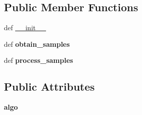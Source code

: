 \subsection*{Public Member Functions}
\begin{DoxyCompactItemize}
\item 
def \hyperlink{classaml__opt_1_1policy__opt_1_1sampler_1_1_batch_sampler_ab3b1c006c6608373f219f70f0bb11c6c}{\-\_\-\-\_\-init\-\_\-\-\_\-}
\item 
\hypertarget{classaml__opt_1_1policy__opt_1_1sampler_1_1_batch_sampler_a04d1b5c2bcd3a4fbdf49872ea14b1f7d}{def {\bfseries obtain\-\_\-samples}}\label{classaml__opt_1_1policy__opt_1_1sampler_1_1_batch_sampler_a04d1b5c2bcd3a4fbdf49872ea14b1f7d}

\item 
\hypertarget{classaml__opt_1_1policy__opt_1_1sampler_1_1_batch_sampler_a11511dda1f7e888d66f4d8c98cc0b3db}{def {\bfseries process\-\_\-samples}}\label{classaml__opt_1_1policy__opt_1_1sampler_1_1_batch_sampler_a11511dda1f7e888d66f4d8c98cc0b3db}

\end{DoxyCompactItemize}
\subsection*{Public Attributes}
\begin{DoxyCompactItemize}
\item 
\hypertarget{classaml__opt_1_1policy__opt_1_1sampler_1_1_batch_sampler_a797ed792a41e9b6963786ce1dc63dbba}{{\bfseries algo}}\label{classaml__opt_1_1policy__opt_1_1sampler_1_1_batch_sampler_a797ed792a41e9b6963786ce1dc63dbba}

\end{DoxyCompactItemize}


